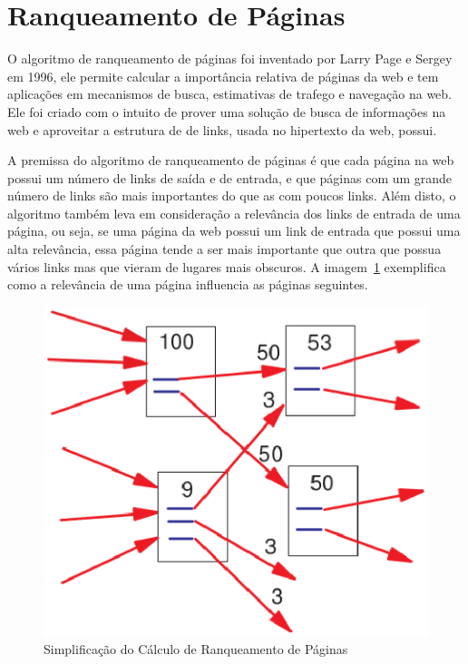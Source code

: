 \section{Ranqueamento de Páginas}
\label{ref:ran}
O algoritmo de ranqueamento de páginas foi inventado por Larry Page e Sergey em
1996, ele permite calcular a importância relativa de páginas da web e tem aplicações
em mecanismos de busca, estimativas de trafego e navegação na web. Ele foi criado
com o intuito de prover uma solução de busca de informações na web e aproveitar
a estrutura de de links, usada no hipertexto da web, possui\cite{pageRank}.

A premissa do algoritmo de ranqueamento de páginas é que cada página na web
possui um número de links de saída e de entrada, e que páginas com um grande
número de links são mais importantes do que as com poucos links. Além disto,
o algoritmo também leva em consideração a relevância dos links de entrada
de uma página, ou seja, se uma página da web possui um link de entrada que
possui uma alta relevância, essa página tende a ser mais importante que outra
que possua vários links mas que vieram de lugares mais obscuros. A imagem~\ref{fig:page_rank}
exemplifica como a relevância de uma página influencia as páginas seguintes.

\begin{figure}[h]
    \centering
        \includegraphics[keepaspectratio=true,scale=0.5]{figuras/page_rank.eps}
    \caption{Simplificação do Cálculo de Ranqueamento de Páginas}
    \label{fig:page_rank}
\end{figure}

